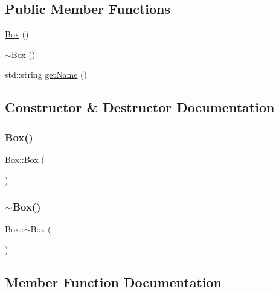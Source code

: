 \subsection*{Public Member Functions}
\begin{DoxyCompactItemize}
\item 
\mbox{\hyperlink{class_box_aca78d7db44972bfa78d46b7bbc8796f6}{Box}} ()
\item 
\mbox{\hyperlink{class_box_a6a5e09398e85d602a046b429062fb9c2}{$\sim$\+Box}} ()
\item 
std\+::string \mbox{\hyperlink{class_box_ac8792393d053c6cac65a36e5c1f27f15}{get\+Name}} ()
\end{DoxyCompactItemize}


\subsection{Constructor \& Destructor Documentation}
\mbox{\label{class_box_aca78d7db44972bfa78d46b7bbc8796f6}} 
\subsubsection{\texorpdfstring{Box()}{Box()}}
{\footnotesize\ttfamily Box\+::\+Box (\begin{DoxyParamCaption}{ }\end{DoxyParamCaption})}

\mbox{\label{class_box_a6a5e09398e85d602a046b429062fb9c2}} 
\subsubsection{\texorpdfstring{$\sim$Box()}{~Box()}}
{\footnotesize\ttfamily Box\+::$\sim$\+Box (\begin{DoxyParamCaption}{ }\end{DoxyParamCaption})}



\subsection{Member Function Documentation}
\mbox{\label{class_box_ac8792393d053c6cac65a36e5c1f27f15}} 
